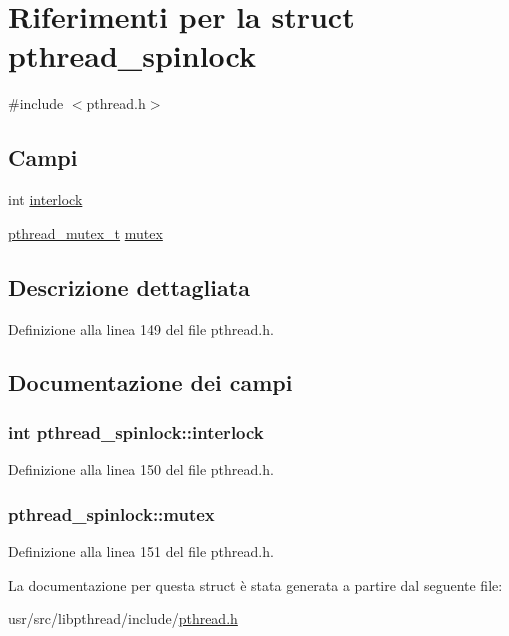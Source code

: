 \hypertarget{structpthread__spinlock}{\section{Riferimenti per la struct pthread\+\_\+spinlock}
\label{structpthread__spinlock}
}


{\ttfamily \#include $<$pthread.\+h$>$}

\subsection*{Campi}
\begin{DoxyCompactItemize}
\item 
int \hyperlink{structpthread__spinlock_a7b8aa3d5e657c6e399aa7a94c8c6d4fe}{interlock}
\item 
\hyperlink{pthread_8h_ad613e9ad2d8d9713a8440618e7a70bba}{pthread\+\_\+mutex\+\_\+t} \hyperlink{structpthread__spinlock_aebd79085a40b0d251d747a24f77746f5}{mutex}
\end{DoxyCompactItemize}


\subsection{Descrizione dettagliata}


Definizione alla linea 149 del file pthread.\+h.



\subsection{Documentazione dei campi}
\hypertarget{structpthread__spinlock_a7b8aa3d5e657c6e399aa7a94c8c6d4fe}{
\subsubsection[{interlock}]{\setlength{\rightskip}{0pt plus 5cm}int pthread\+\_\+spinlock\+::interlock}}\label{structpthread__spinlock_a7b8aa3d5e657c6e399aa7a94c8c6d4fe}


Definizione alla linea 150 del file pthread.\+h.

\hypertarget{structpthread__spinlock_aebd79085a40b0d251d747a24f77746f5}{
\subsubsection[{mutex}]{ pthread\+\_\+spinlock\+::mutex}}\label{structpthread__spinlock_aebd79085a40b0d251d747a24f77746f5}


Definizione alla linea 151 del file pthread.\+h.



La documentazione per questa struct è stata generata a partire dal seguente file\+:\begin{DoxyCompactItemize}
\item 
usr/src/libpthread/include/\hyperlink{pthread_8h}{pthread.\+h}\end{DoxyCompactItemize}
